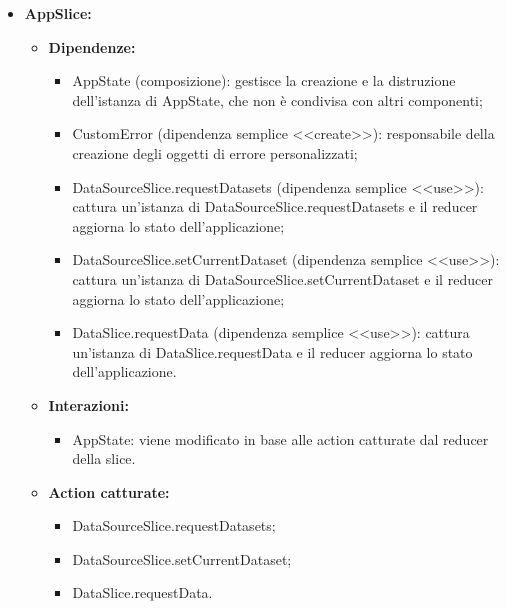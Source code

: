 \begin{itemize}
    \item \textbf{AppSlice:}
          \begin{itemize}
              \item \textbf{Dipendenze:}
                    \begin{itemize}
                        \item AppState (composizione): gestisce la creazione e la distruzione dell'istanza di
                              AppState, che non è condivisa con altri componenti;
                        \item CustomError (dipendenza semplice <<create>>): responsabile della creazione
                              degli oggetti di errore personalizzati;
                        \item DataSourceSlice.requestDatasets (dipendenza semplice <<use>>): cattura
                              un'istanza di DataSourceSlice.requestDatasets e il reducer aggiorna lo stato
                              dell'applicazione;
                        \item DataSourceSlice.setCurrentDataset (dipendenza semplice <<use>>): cattura
                              un'istanza di DataSourceSlice.setCurrentDataset e il reducer aggiorna lo stato
                              dell'applicazione;
                        \item DataSlice.requestData (dipendenza semplice <<use>>): cattura un'istanza di
                              DataSlice.requestData e il reducer aggiorna lo stato dell'applicazione.
                    \end{itemize}
              \item \textbf{Interazioni:}
                    \begin{itemize}
                        \item AppState: viene modificato in base alle action catturate dal reducer della
                              slice.
                    \end{itemize}
              \item \textbf{Action catturate:}
                    \begin{itemize}
                        \item DataSourceSlice.requestDatasets;
                        \item DataSourceSlice.setCurrentDataset;
                        \item DataSlice.requestData.
                    \end{itemize}
          \end{itemize}


\end{itemize}
